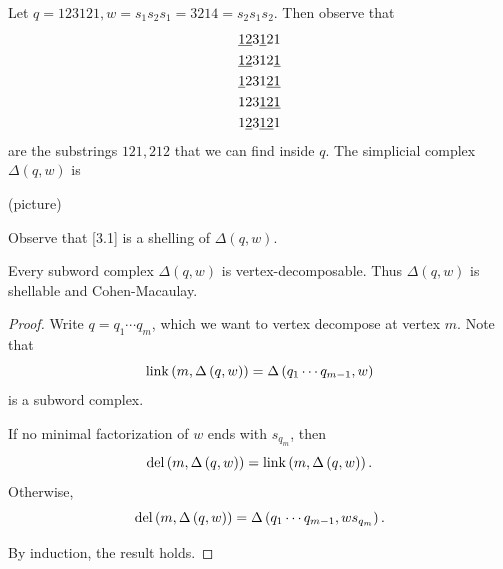 \documentclass[co439]{subfiles}
\begin{document}
    \begin{example}{}
        Let $q=123121, w= s_1s_2s_1 = 3214 = s_2s_1s_2$. Then observe that
        \begin{equation}
            \begin{aligned}
                \text{\underline{12}3\underline{1}21} \\ 
                \text{\underline{12}312\underline{1}} \\ 
                \text{\underline{1}231\underline{21}} \\ 
                \text{123\underline{121}} \\ 
                \text{1\underline{2}3\underline{12}1} \\ 
            \end{aligned} 
        \end{equation}
        are the substrings $121, 212$ that we can find inside $q$. The simplicial complex $\Delta\left( q,w \right)$ is
        \begin{center}
            (picture)
        \end{center}
        Observe that [3.1] is a shelling of $\Delta\left( q,w \right)$.
    \end{example}
    
    \rruleline

    \begin{theorem}{}
        Every subword complex $\Delta\left( q,w \right)$ is vertex-decomposable. Thus $\Delta\left( q,w \right)$ is shellable and Cohen-Macaulay.
    \end{theorem}

    \begin{proof}
        Write $q=q_1\cdots q_m$, which we want to vertex decompose at vertex $m$. Note that
        \begin{equation*}
            \operatorname{link}\left( m,\Delta\left( q,w \right)\right) = \Delta\left( q_1\cdots q_{m-1},w \right)
        \end{equation*}
        is a subword complex.

        If no minimal factorization of $w$ ends with $s_{q_m}$, then
        \begin{equation*}
            \operatorname{del}\left( m,\Delta\left( q,w \right) \right) = \operatorname{link}\left( m,\Delta\left( q,w \right) \right).
        \end{equation*}
        Otherwise,
        \begin{equation*}
            \operatorname{del}\left( m,\Delta\left( q,w \right) \right) = \Delta\left( q_1\cdots q_{m-1}, ws_{q_m} \right).
        \end{equation*}

        By induction, the result holds.
    \end{proof}
\end{document}
